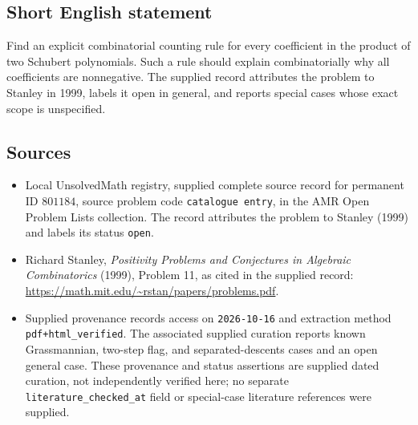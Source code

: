 \documentclass[11pt]{article}
\begin{document}
\subsection{Short English statement}
Find an explicit combinatorial counting rule for every coefficient in the product of two Schubert polynomials. Such a rule should explain combinatorially why all coefficients are nonnegative. The supplied record attributes the problem to Stanley in 1999, labels it open in general, and reports special cases whose exact scope is unspecified.
\subsection{Sources}
\begin{itemize}
\item Local UnsolvedMath registry, supplied complete source record for permanent ID \(801184\), source problem code \texttt{catalogue entry}, in the AMR Open Problem Lists collection. The record attributes the problem to Stanley (1999) and labels its status \texttt{open}.
\item Richard Stanley, \emph{Positivity Problems and Conjectures in Algebraic Combinatorics} (1999), Problem 11, as cited in the supplied record: \url{https://math.mit.edu/~rstan/papers/problems.pdf}.
\item Supplied provenance records access on \texttt{2026-10-16} and extraction method \texttt{pdf+html\_verified}. The associated supplied curation reports known Grassmannian, two-step flag, and separated-descents cases and an open general case. These provenance and status assertions are supplied dated curation, not independently verified here; no separate \texttt{literature\_checked\_at} field or special-case literature references were supplied.
\end{itemize}
\end{document}

